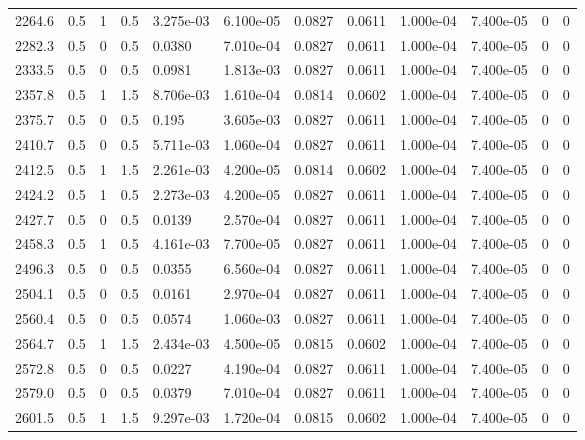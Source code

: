 \documentclass[preview]{standalone}
\begin{document}
{{{\begin{tabular}{L{1.2cm}C{1.2cm} C{0.3cm}C{0.5cm} C{1.4cm}C{1.4cm} C{1.4cm}C{1.4cm} C{1.6cm}C{1.6cm} C{1.6cm}C{1.6cm}}
  2264.6  &   0.5  & 1     & 0.5 &  3.275e-03  & 6.100e-05  &  0.0827&   0.0611& 1.000e-04 & 7.400e-05   &  0 & 0  \\ 
  2282.3  &   0.5  & 0     & 0.5 &  0.0380  & 7.010e-04  &  0.0827&   0.0611& 1.000e-04 & 7.400e-05   &  0 & 0  \\ 
  2333.5  &   0.5  & 0     & 0.5 &  0.0981  & 1.813e-03  &  0.0827&   0.0611& 1.000e-04 & 7.400e-05   &  0 & 0  \\ 
  2357.8  &   0.5  & 1     & 1.5 &  8.706e-03  & 1.610e-04  &  0.0814&   0.0602& 1.000e-04 & 7.400e-05   &  0 & 0  \\ 
  2375.7  &   0.5  & 0     & 0.5 &  0.195  & 3.605e-03  &  0.0827&   0.0611& 1.000e-04 & 7.400e-05   &  0 & 0  \\ 
  2410.7  &   0.5  & 0     & 0.5 &  5.711e-03  & 1.060e-04  &  0.0827&   0.0611& 1.000e-04 & 7.400e-05   &  0 & 0  \\ 
  2412.5  &   0.5  & 1     & 1.5 &  2.261e-03  & 4.200e-05  &  0.0814&   0.0602& 1.000e-04 & 7.400e-05   &  0 & 0  \\ 
  2424.2  &   0.5  & 1     & 0.5 &  2.273e-03  & 4.200e-05  &  0.0827&   0.0611& 1.000e-04 & 7.400e-05   &  0 & 0  \\ 
  2427.7  &   0.5  & 0     & 0.5 &  0.0139  & 2.570e-04  &  0.0827&   0.0611& 1.000e-04 & 7.400e-05   &  0 & 0  \\ 
  2458.3  &   0.5  & 1     & 0.5 &  4.161e-03  & 7.700e-05  &  0.0827&   0.0611& 1.000e-04 & 7.400e-05   &  0 & 0  \\ 
  2496.3  &   0.5  & 0     & 0.5 &  0.0355  & 6.560e-04  &  0.0827&   0.0611& 1.000e-04 & 7.400e-05   &  0 & 0  \\ 
  2504.1  &   0.5  & 0     & 0.5 &  0.0161  & 2.970e-04  &  0.0827&   0.0611& 1.000e-04 & 7.400e-05   &  0 & 0  \\ 
  2560.4  &   0.5  & 0     & 0.5 &  0.0574  & 1.060e-03  &  0.0827&   0.0611& 1.000e-04 & 7.400e-05   &  0 & 0  \\ 
  2564.7  &   0.5  & 1     & 1.5 &  2.434e-03  & 4.500e-05  &  0.0815&   0.0602& 1.000e-04 & 7.400e-05   &  0 & 0  \\ 
  2572.8  &   0.5  & 0     & 0.5 &  0.0227  & 4.190e-04  &  0.0827&   0.0611& 1.000e-04 & 7.400e-05   &  0 & 0  \\ 
  2579.0  &   0.5  & 0     & 0.5 &  0.0379  & 7.010e-04  &  0.0827&   0.0611& 1.000e-04 & 7.400e-05   &  0 & 0  \\ 
  2601.5  &   0.5  & 1     & 1.5 &  9.297e-03  & 1.720e-04  &  0.0815&   0.0602& 1.000e-04 & 7.400e-05   &  0 & 0  \\ 

\end{tabular}}}}
\end{document}

